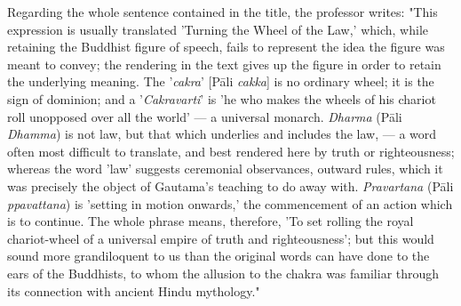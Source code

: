 \documentclass[a4paper, 11pt, oneside, polutonikogreek, english]{article}
\begin{document}
Regarding the whole sentence contained in the title, the professor writes: "This expression is usually translated 'Turning the Wheel of the Law,' which, while retaining the Buddhist figure of speech, fails to represent the idea the figure was meant to convey; the rendering in the text gives up the figure in order to retain the underlying meaning. The '\emph{cakra}' [Pāli \emph{cakka}] is no ordinary wheel; it is the sign of dominion; and a '\emph{Cakravarti}' is 'he who makes the wheels of his chariot roll unopposed over all the world' --- a universal monarch. \emph{Dharma} (Pāli \emph{Dhamma}) is not law, but that which underlies and includes the law, --- a word often most difficult to translate, and best rendered here by truth or righteousness; whereas the word 'law' suggests ceremonial observances, outward rules, which it was precisely the object of Gautama's teaching to do away with. \emph{Pravartana} (Pāli \emph{ppavattana}) is 'setting in motion onwards,' the commencement of an action which is to continue. The whole phrase means, therefore, 'To set rolling the royal chariot-wheel of a universal empire of truth and righteousness'; but this would sound more grandiloquent to us than the original words can have done to the ears of the Buddhists, to whom the allusion to the chakra was familiar through its connection with ancient Hindu mythology."
\end{document}
